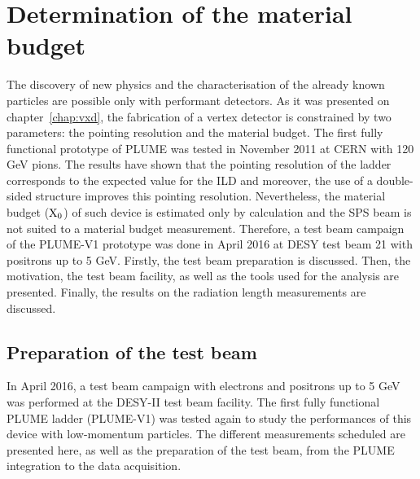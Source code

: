 \chapter{Determination of the material budget}

  The discovery of new physics and the characterisation of the already known particles are possible only with performant detectors.
  As it was presented on chapter~\ref{chap:vxd}, the fabrication of a vertex detector is constrained by two parameters: the pointing resolution and the material budget.
  The first fully functional prototype of \gls{PLUME} was tested in November 2011 at CERN with 120 GeV pions.
  The results have shown that the pointing resolution of the ladder corresponds to the expected value for the \gls{ILD} and moreover, the use of a double-sided structure improves this pointing resolution. 
  Nevertheless, the material budget ($\rm{X}_0$) of such device is estimated only by calculation and the SPS beam is not suited to a material budget measurement.
  Therefore, a test beam campaign of the PLUME-V1 prototype was done in April 2016 at DESY test beam 21 with positrons up to 5 GeV.
  Firstly, the test beam preparation is discussed.
  Then, the motivation, the test beam facility, as well as the tools used for the analysis are presented.
  Finally, the results on the radiation length measurements are discussed.


\minitoc

  \section{Preparation of the test beam}

  In April 2016, a test beam campaign with electrons and positrons up to 5 GeV was performed at the DESY-II test beam facility.
  The first fully functional PLUME ladder (PLUME-V1) was tested again to study the performances of this device with low-momentum particles.
  The different measurements scheduled are presented here, as well as the preparation of the test beam, from the PLUME integration to the data acquisition.

